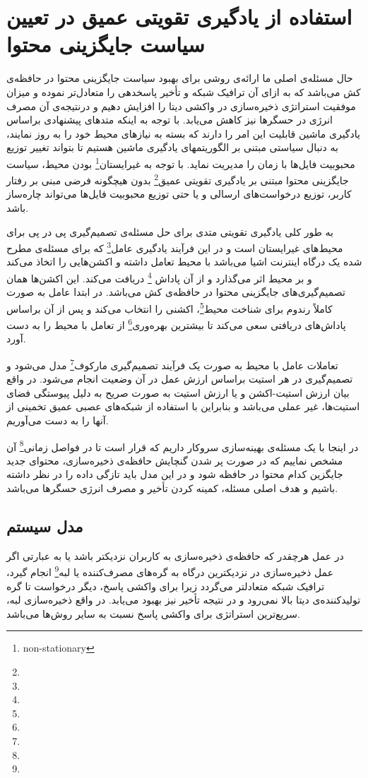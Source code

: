 \section{استفاده از یادگیری تقویتی عمیق در تعیین سیاست جایگزینی محتوا}
حال مسئله‌ی اصلی ما ارائه‌ی روشی برای بهبود سیاست جایگزینی محتوا در حافظه‌ی کش می‌باشد که به ازای آن ترافیک شبکه و تأخیر پاسخدهی را متعادل‌تر نموده و میزان موفقیت استراتژی ذخیره‌سازی در واکشی دیتا را افزایش دهیم و درنتیجه‌ی آن مصرف انرژی در حسگرها نیز کاهش می‌یابد. با توجه به اینکه متدهای پیشنهادی براساس یادگیری ماشین قابلیت این امر را دارند که بسته به نیازهای محیط خود را به روز نمایند، به دنبال سیاستی مبتنی بر الگوریتمهای یادگیری ماشین هستیم تا بتواند تغییر توزیع محبوبیت فایل‌ها با زمان را مدیریت نماید. با توجه به غیرایستان\footnote{non-stationary} بودن محیط، سیاست جایگزینی محتوا مبتنی بر یادگیری تقویتی عمیق\footnote{} بدون هیچگونه فرضی مبنی بر رفتار کاربر، توزیع درخواست‌های ارسالی و یا حتی توزیع محبوبیت فایل‌ها می‌تواند چاره‌ساز باشد. 

به طور کلی یادگیری تقویتی متدی برای حل مسئله‌ی تصمیم‌گیری پی در پی برای محیط‌های غیرایستان است و در این فرآیند یادگیری عامل\footnote{} که برای مسئله‌ی مطرح شده یک درگاه اینترنت اشیا می‌باشد با محیط تعامل داشته و اکشن‌هایی را اتخاذ می‌کند و بر محیط اثر می‌گذارد و از آن پاداش \footnote{} دریافت می‌کند. این اکشن‌ها همان تصمیم‌گیری‌های جایگزینی محتوا در حافظه‌ی کش می‌باشد. در ابتدا عامل به صورت کاملاً رندوم برای شناخت محیط\footnote{}، اکشنی را انتخاب می‌کند و پس از آن براساس پاداش‌های دریافتی سعی می‌کند تا بیشترین بهره‌وری\footnote{} از تعامل با محیط را به دست آورد.

تعاملات عامل با محیط به صورت یک فرآیند تصمیم‌گیری مارکوف\footnote{} مدل می‌شود و تصمیم‌گیری در هر استیت براساس ارزش عمل در آن وضعیت انجام می‌شود. در واقع بیان ارزش استیت-اکشن و یا ارزش استیت به صورت صریح به دلیل پیوستگی فضای استیت‌ها،‌ غیر عملی می‌باشد و بنابراین با استفاده از  شبکه‌های عصبی عمیق تخمینی از آنها را به دست می‌آوریم. \cite{cachingtransientdata2018}

در اینجا با یک مسئله‌ی بهینه‌سازی سروکار داریم که قرار است تا در فواصل زمانی\footnote{} آن مشخص نماییم که در صورت پر شدن گنچایش حافظه‌ی ذخیره‌سازی، محتوای جدید جایگزین کدام محتوا در حافظه شود و در این مدل باید تازگی داده را در نظر داشته باشیم و هدف اصلی مسئله، کمینه کردن تأخیر و مصرف انرژی حسگرها می‌باشد.

\subsection{مدل سیستم}
در عمل هرچقدر که حافظه‌ی ذخیره‌سازی به کاربران نزدیکتر باشد یا به عبارتی اگر عمل ذخیره‌سازی در نزدیکترین درگاه به گره‌های مصرف‌کننده یا لبه\footnote{} انجام گیرد، ترافیک شبکه متعادلتر می‌گردد زیرا برای واکشی پاسخ، دیگر درخواست تا گره تولیدکننده‌ی دیتا بالا نمی‌رود و در نتیجه تأخیر نیز بهبود می‌یابد. در واقع ذخیره‌سازی لبه، سریع‌ترین استراتژی برای واکشی پاسخ نسبت به سایر روش‌ها می‌باشد.


